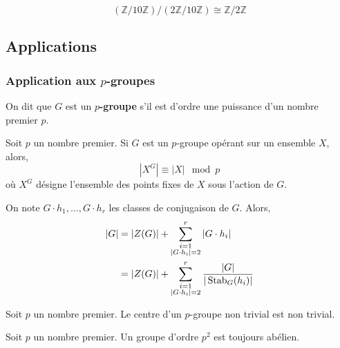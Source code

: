   \begin{example}
    \[ (\mathbb{Z}/10\mathbb{Z})/(2\mathbb{Z}/10\mathbb{Z}) \cong \mathbb{Z}/2\mathbb{Z} \]
  \end{example}

  \subsection{Applications}

  \subsubsection{Application aux \texorpdfstring{$p$}{p}-groupes}


  \begin{definition}
    On dit que $G$ est un \textbf{$p$-groupe} s'il est d'ordre une puissance d'un nombre premier $p$.
  \end{definition}

  \begin{proposition}
    Soit $p$ un nombre premier. Si $G$ est un $p$-groupe opérant sur un ensemble $X$, alors,
    \[ |X^G| \equiv |X| \mod p \]
    où $X^G$ désigne l'ensemble des points fixes de $X$ sous l'action de $G$.
  \end{proposition}

  \begin{corollary}
    On note $G \cdot h_1, \dots, G \cdot h_r$ les classes de conjugaison de $G$. Alors,
    \begin{align*}
      \vert G \vert &= \vert Z(G) \vert + \sum_{\substack{i=1 \\ \vert G \cdot h_i \vert = 2}}^{r} \vert G \cdot h_i \vert \\
      &= \vert Z(G) \vert + \sum_{\substack{i=1 \\ \vert G \cdot h_i \vert = 2}}^{r} \frac{\vert G \vert}{\vert \operatorname{Stab}_G(h_i) \vert}
    \end{align*}
  \end{corollary}

  \begin{corollary}
    Soit $p$ un nombre premier. Le centre d'un $p$-groupe non trivial est non trivial.
  \end{corollary}

  \begin{corollary}
    Soit $p$ un nombre premier. Un groupe d'ordre $p^2$ est toujours abélien.
  \end{corollary}

